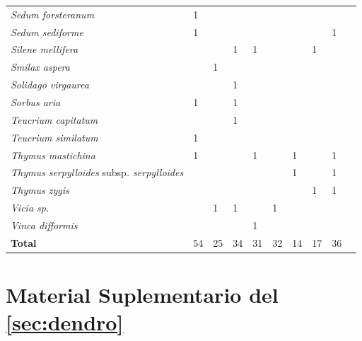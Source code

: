 {\begin{longtable}{llllllllll}
\textit{Sedum forsteranum}  & 1 &  &  &  &  &  &  &  \\
\textit{Sedum sediforme}  & 1 &  &  &  &  &  &  & 1 \\
\textit{Silene mellifera}  &  &  & 1 & 1 &  &  & 1 &  \\
\textit{Smilax aspera}  &  & 1 &  &  &  &  &  &  \\
\textit{Solidago virgaurea}  &  &  & 1 &  &  &  &  &  \\
\textit{Sorbus aria}  & 1 &  & 1 &  &  &  &  &  \\
\textit{Teucrium capitatum}  &  &  & 1 &  &  &  &  &  \\
\textit{Teucrium similatum}  & 1 &  &  &  &  &  &  &  \\
\textit{Thymus mastichina}  & 1 &  &  & 1 &  & 1 &  & 1 \\
\textit{Thymus serpylloides }subsp\textit{. serpylloides}  &  &  &  &  &  & 1 &  & 1 \\
\textit{Thymus zygis}  &  &  &  &  &  &  & 1 & 1 \\
\textit{Vicia sp.}  &  & 1 & 1 &  & 1 &  &  &  \\
\textit{Vinca difformis}  &  &  &  & 1 &  &  &  &  \\ 
\hline
\textbf{Total}  & 54 & 25 & 34 & 31 & 32 & 14 & 17 & 36 \\
\bottomrule
\end{longtable}

}%

\newpage


\chapter{Material Suplementario del  \autoref{sec:dendro}}\label{sec:appendix:dendro}

